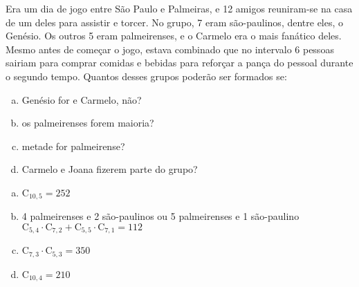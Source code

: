 \begin{ex}
 Era um dia de jogo entre São Paulo e Palmeiras, e 12 amigos reuniram-se na casa de um deles para assistir e torcer. No grupo, 7 eram são-paulinos, dentre eles, o Genésio. Os outros 5 eram palmeirenses, e o Carmelo era o mais fanático deles. Mesmo antes de começar o jogo, estava combinado que no intervalo 6 pessoas sairiam para comprar comidas e bebidas para reforçar a pança do pessoal durante o segundo tempo. Quantos desses grupos poderão ser formados se:
    \begin{enumerate}[(a)]
    \item Genésio for e Carmelo, não?
    \item os palmeirenses forem maioria?
    \item metade for palmeirense?
    \item Carmelo e Joana fizerem parte do grupo?
    \end{enumerate}
      \begin{sol}
       \phantom{A}
         \begin{enumerate} [(a)]
             \item $\mathrm{C}_{{10},5}=252$
             \item 4 palmeirenses e 2 são-paulinos ou 5 palmeirenses e 1 são-paulino \\ $\mathrm{C}_{5,4}\cdot\mathrm{C}_{7,2}+\mathrm{C}_{5,5}\cdot\mathrm{C}_{7,1}=112$
             \item $\mathrm{C}_{7,3}\cdot\mathrm{C}_{5,3}=350$
             \item $\mathrm{C}_{{10},4}=210$
         \end{enumerate}
      \end{sol}
\end{ex}